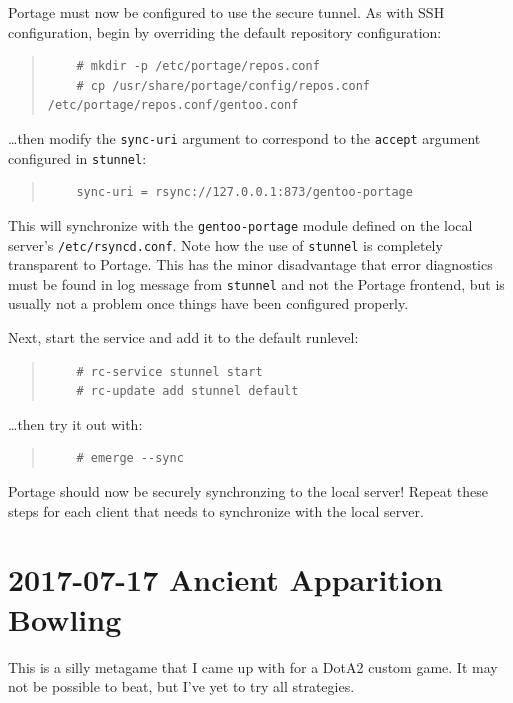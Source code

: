 \documentclass{article}
\begin{document}
Portage must now be configured to use the secure tunnel.  As with SSH configuration, begin by overriding the default repository configuration:
\begin{quote}
\begin{verbatim}
	# mkdir -p /etc/portage/repos.conf
	# cp /usr/share/portage/config/repos.conf /etc/portage/repos.conf/gentoo.conf
\end{verbatim}
\end{quote}
\ldots then modify the \texttt{sync-uri} argument to correspond to the \texttt{accept} argument configured in \texttt{stunnel}:
\begin{quote}
\begin{verbatim}
	sync-uri = rsync://127.0.0.1:873/gentoo-portage
\end{verbatim}
\end{quote}
This will synchronize with the \texttt{gentoo-portage} module defined on the local server's \texttt{/etc/rsyncd.conf}.  Note how the use of \texttt{stunnel} is completely transparent to Portage.  This has the minor disadvantage that error diagnostics must be found in log message from \texttt{stunnel} and not the Portage frontend, but is usually not a problem once things have been configured properly.

Next, start the service and add it to the default runlevel:
\begin{quote}
\begin{verbatim}
	# rc-service stunnel start
	# rc-update add stunnel default
\end{verbatim}
\end{quote}
\ldots then try it out with:
\begin{quote}
\begin{verbatim}
	# emerge --sync
\end{verbatim}
\end{quote}
Portage should now be securely synchronzing to the local server!  Repeat these steps for each client that needs to synchronize with the local server.


\section{2017-07-17 Ancient Apparition Bowling}
This is a silly metagame that I came up with for a DotA2 custom game.  It may not be possible to beat, but I've yet to try all strategies.
\end{document}
